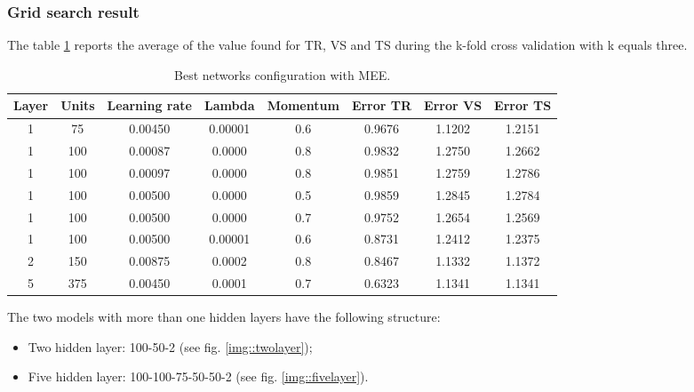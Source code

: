 \subsubsection{Grid search result}
The table \ref{tab:best_nets} reports the average of the value found for TR, VS and TS during the k-fold cross validation with k equals three.   
\begin{center}
\small\addtolength{\tabcolsep}{-3pt}
\begin{table}[h!]
	\centering
	\begin{tabular}{|c|c|c|c|c|c|c|c|}
		\hline
		\textbf{Layer}& \textbf{Units}& \textbf{Learning rate} & \multicolumn{1}{l|}{\textbf{Lambda}} & \textbf{Momentum} & \textbf{Error TR}& \textbf{Error VS}& \textbf{Error TS}\\ \hline
			1 & 75 & 0.00450 & 0.00001 & 0.6  & 0.9676 & 1.1202 & 1.2151  \\
			1 & 100 & 0.00087 & 0.0000 & 0.8  & 0.9832 & 1.2750 &  1.2662\\
			1 & 100 & 0.00097 & 0.0000 & 0.8  & 0.9851 & 1.2759 &  1.2786\\
			1 & 100 & 0.00500 & 0.0000 & 0.5  & 0.9859 & 1.2845 & 1.2784 \\
			1 & 100 & 0.00500 & 0.0000 & 0.7  & 0.9752 & 1.2654 & 1.2569 \\
			1 & 100 & 0.00500 & 0.00001 & 0.6  & 0.8731& 1.2412 & 1.2375 \\
			2 & 150 & 0.00875 & 0.0002 & 0.8  & 0.8467 & 1.1332 &  1.1372 \\
			5 & 375 & 0.00450 & 0.0001 & 0.7  & 0.6323 & 1.1341 &  1.1341 \\
		  \hline
	\end{tabular}
		\caption{Best networks configuration with MEE.}
		\label{tab:best_nets}
\end{table}
\end{center}
The two models with more than one hidden layers have the following structure:
\begin{itemize}
	\item Two hidden layer: 100-50-2 (see fig. \ref{img::twolayer});
	\item Five hidden layer: 100-100-75-50-50-2 (see fig. \ref{img::fivelayer}).
\end{itemize}

